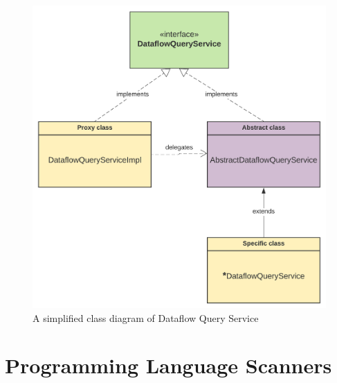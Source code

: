 \begin{figure}[ht]\centering
\includegraphics[width=1.0\textwidth]{img/cls.png}
\caption{A simplified class diagram of Dataflow Query Service}
\label{fig01:QS}
\end{figure}  

\section{Programming Language Scanners}

